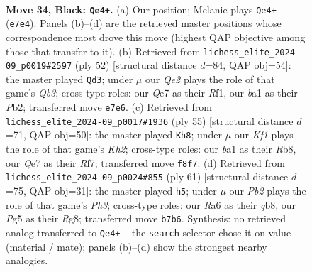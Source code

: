 \documentclass[11pt]{article}
\begin{document}
\clearpage

\begin{figure}[p]\centering
\begin{subfigure}{0.46\textwidth}\centering
\resizebox{\linewidth}{!}{%
\newchessgame
\chessboard[
  setfen={1rb2k2/1p2q2p/r2n4/2R3p1/N7/4P1P1/P4PKP/B2QR3 b - - 4 34},
  showmover=false,
  pgfstyle=straightmove, color=movearrow, markmove={e7-e4}
]}
\caption{}
\end{subfigure}\hfill
\begin{subfigure}{0.46\textwidth}\centering
\resizebox{\linewidth}{!}{%
\newchessgame
\chessboard[
  setfen={5rk1/p4pp1/1p5p/4p1q1/8/PQ4N1/1PB3rP/1K3R2 w - - 0 27},
  showmover=false,
  pgfstyle=straightmove, color=movearrow, markmove={b3-d3}
]}
\caption{}
\end{subfigure}
\\[4pt]
\begin{subfigure}{0.46\textwidth}\centering
\resizebox{\linewidth}{!}{%
\newchessgame
\chessboard[
  setfen={1r1q4/5r1k/1p5p/2pn3p/4N3/4P2P/1RQ2PP1/5RK1 b - - 1 28},
  showmover=false,
  pgfstyle=straightmove, color=movearrow, markmove={h7-h8}
]}
\caption{}
\end{subfigure}\hfill
\begin{subfigure}{0.46\textwidth}\centering
\resizebox{\linewidth}{!}{%
\newchessgame
\chessboard[
  setfen={1Q1nkbr1/p2q1p2/7p/3pP3/3P4/1RB3P1/P4R1P/6K1 b - - 2 31},
  showmover=false,
  pgfstyle=straightmove, color=movearrow, markmove={h6-h5}
]}
\caption{}
\end{subfigure}
\caption{\textbf{Move 34, Black: \texttt{Qe4+}.} (a) Our position; Melanie plays \texttt{Qe4+} (\texttt{e7e4}). Panels (b)--(d) are the retrieved master positions whose correspondence most drove this move (highest QAP objective among those that transfer to it). (b) Retrieved from \texttt{lichess\_elite\_2024-09\_p0019\#2597} (ply 52) [structural distance $d$=84, QAP obj=54]: the master played \texttt{Qd3}; under $\mu$ our \emph{Qe2} plays the role of that game's \emph{Qb3}; cross-type roles: our \emph{Q}e7 as their \emph{R}f1, our \emph{b}a1 as their \emph{P}b2; transferred move \texttt{e7e6}. (c) Retrieved from \texttt{lichess\_elite\_2024-09\_p0017\#1936} (ply 55) [structural distance $d$=71, QAP obj=50]: the master played \texttt{Kh8}; under $\mu$ our \emph{Kf1} plays the role of that game's \emph{Kh2}; cross-type roles: our \emph{b}a1 as their \emph{R}b8, our \emph{Q}e7 as their \emph{R}f7; transferred move \texttt{f8f7}. (d) Retrieved from \texttt{lichess\_elite\_2024-09\_p0024\#855} (ply 61) [structural distance $d$=75, QAP obj=31]: the master played \texttt{h5}; under $\mu$ our \emph{Pb2} plays the role of that game's \emph{Ph3}; cross-type roles: our \emph{R}a6 as their \emph{q}b8, our \emph{P}g5 as their \emph{R}g8; transferred move \texttt{b7b6}. Synthesis: no retrieved analog transferred to \texttt{Qe4+} -- the \texttt{search} selector chose it on value (material / mate); panels (b)--(d) show the strongest nearby analogies.}
\label{fig:thought-m67}
\end{figure}
\end{document}
